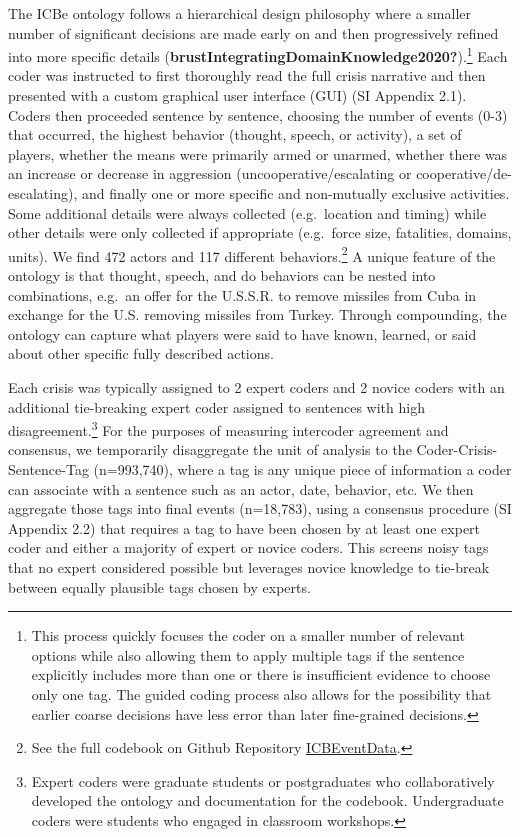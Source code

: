 \documentclass{article}
\begin{document}
The ICBe ontology follows a hierarchical design philosophy where a
smaller number of significant decisions are made early on and then
progressively refined into more specific details
(\textbf{brustIntegratingDomainKnowledge2020?}).\footnote{This process
  quickly focuses the coder on a smaller number of relevant options
  while also allowing them to apply multiple tags if the sentence
  explicitly includes more than one or there is insufficient evidence to
  choose only one tag. The guided coding process also allows for the
  possibility that earlier coarse decisions have less error than later
  fine-grained decisions.} Each coder was instructed to first thoroughly
read the full crisis narrative and then presented with a custom
graphical user interface (GUI) (SI Appendix 2.1). Coders then proceeded
sentence by sentence, choosing the number of events (0-3) that occurred,
the highest behavior (thought, speech, or activity), a set of players,
whether the means were primarily armed or unarmed, whether there was an
increase or decrease in aggression (uncooperative/escalating or
cooperative/de-escalating), and finally one or more specific and
non-mutually exclusive activities. Some additional details were always
collected (e.g.~location and timing) while other details were only
collected if appropriate (e.g.~force size, fatalities, domains, units).
We find 472 actors and 117 different behaviors.\footnote{See the full
  codebook on Github Repository
  \href{https://urldefense.com/v3/__https://github.com/CenterForPeaceAndSecurityStudies/ICBEventData__;!!Mih3wA!WxDJtEczKfxGTh0S2Krunap8ReymFEL5iTWaSfOHeqlSdyfRx77zmjBSWO1OAm13$}{ICBEventData}.}
A unique feature of the ontology is that thought, speech, and do
behaviors can be nested into combinations, e.g.~an offer for the
U.S.S.R. to remove missiles from Cuba in exchange for the U.S. removing
missiles from Turkey. Through compounding, the ontology can capture what
players were said to have known, learned, or said about other specific
fully described actions.

Each crisis was typically assigned to 2 expert coders and 2 novice
coders with an additional tie-breaking expert coder assigned to
sentences with high disagreement.\footnote{Expert coders were graduate
  students or postgraduates who collaboratively developed the ontology
  and documentation for the codebook. Undergraduate coders were students
  who engaged in classroom workshops.} For the purposes of measuring
intercoder agreement and consensus, we temporarily disaggregate the unit
of analysis to the Coder-Crisis-Sentence-Tag (n=993,740), where a tag is
any unique piece of information a coder can associate with a sentence
such as an actor, date, behavior, etc. We then aggregate those tags into
final events (n=18,783), using a consensus procedure (SI Appendix 2.2)
that requires a tag to have been chosen by at least one expert coder and
either a majority of expert or novice coders. This screens noisy tags
that no expert considered possible but leverages novice knowledge to
tie-break between equally plausible tags chosen by experts.
\end{document}
